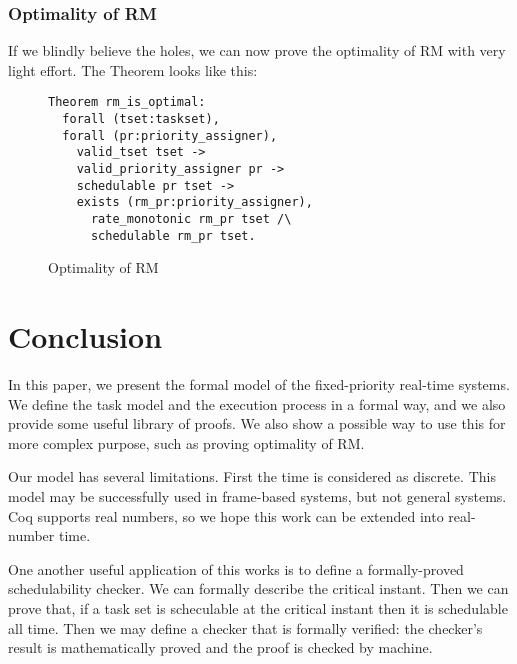 \documentclass[nocopyrightspace]{sigplanconf}
\begin{document}
\subsubsection{Optimality of RM}
If we blindly believe the holes, we can now prove the optimality of RM with very light effort.
The Theorem looks like this:

\begin{figure}[H]
\begin{verbatim}
Theorem rm_is_optimal:
  forall (tset:taskset),
  forall (pr:priority_assigner),
    valid_tset tset ->
    valid_priority_assigner pr ->
    schedulable pr tset ->
    exists (rm_pr:priority_assigner),
      rate_monotonic rm_pr tset /\
      schedulable rm_pr tset.
\end{verbatim}
\caption{ Optimality of RM }\label{fig:rm-opt}
\end{figure}


\section{Conclusion}

In this paper, we present the formal model of the fixed-priority real-time systems. We define the task model
and the execution process in a formal way, and we also provide some useful library of proofs. We also show
a possible way to use this for more complex purpose, such as proving optimality of RM.

Our model has several limitations. First the time is considered as discrete. This model may be successfully
used in frame-based systems, but not general systems. Coq supports real numbers, so we hope this work can
be extended into real-number time.

One another useful application of this works is to define a formally-proved schedulability checker. We can
formally describe the critical instant. Then we can prove that, if a task set is scheculable at the critical instant
then it is schedulable all time. Then we may define a checker that is formally verified: the checker's result
is mathematically proved and the proof is checked by machine.






\end{document}
